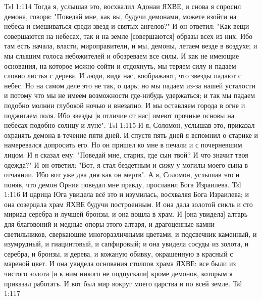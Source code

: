 \vs Tsl 1:114 
Тогда я, услышав это, восхвалил Адонаи ЯХВЕ, и снова я спросил демона, говоря: "Поведай мне, как вы, будучи демонами, можете взойти на небеса и смешиваться среди звезд и святых ангелов?" И он ответил: "Как вещи совершаются на небесах, так и на земле [совершаются] образы всех из них. Ибо там есть начала, власти, мироправители, и мы, демоны, летаем везде в воздухе; и мы слышим голоса небожителей и обозреваем все силы. И как не имеющие основания, на которое можно сойти и отдохнуть, мы теряем силу и падаем словно листья с дерева. И люди, видя нас, воображают, что звезды падают с небес. Но на самом деле это не так, о царь; но мы падаем из-за нашей усталости и потому что мы не имеем возможности где-нибудь удержаться; и так мы падаем подобно молнии глубокой ночью и внезапно. И мы оставляем города в огне и поджигаем поля. Ибо звезды [в отличие от нас] имеют прочные основы на небесах подобно солнцу и луне".
\vs Tsl 1:115 
И я, Соломон, услышав это, приказал охранять демона в течение пяти дней. И спустя пять дней я вспомнил о старике и намеревался допросить его. Но он пришел ко мне в печали и с почерневшим лицом. И я сказал ему: "Поведай мне, старик, где сын твой? И что значит твоя одежда?" И он ответил: "Вот, я стал бездетным и сижу у могилы моего сына в отчаянии. Ибо вот уже два дня как он мертв". А я, Соломон, услышав это и поняв, что демон Орния поведал мне правду, прославил Бога Израилева.
\vs Tsl 1:116 
И царица Юга увидела всё это и изумилась, восхваляя Бога Израилева; и она созерцала храм ЯХВЕ будучи построенным. И она дала золотой сикль и сто мириад серебра и лучшей бронзы, и она вошла в храм. И [она увидела] алтарь для благовоний и медные опоры этого алтаря, и драгоценные камни светильников, сверкающие многоразличными цветами, и подсвечник каменный, и изумрудный, и гиацинтовый, и сапфировый; и она увидела сосуды из золота, и серебра, и бронзы, и дерева, и кожаную обивку, окрашенную в красный с мареной цвет. И она увидела основания столпов храма ЯХВЕ: все были из чистого золота [и к ним никого не подпускали] кроме демонов, которым я приказал работать. И вот был мир вокруг моего царства и по всей земле.
\vs Tsl 1:117 
